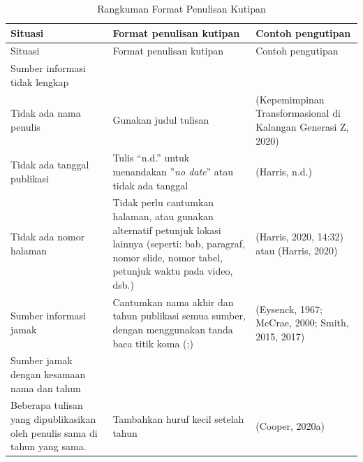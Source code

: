 \documentclass[
  indonesian,
  letterpaper,
]{scrbook}
\begin{document}
\begin{longtable}[]{@{}
  >{\raggedright\arraybackslash}p{}
  >{\raggedright\arraybackslash}p{}
  >{\raggedright\arraybackslash}p{}@{}}
\caption{Rangkuman Format Penulisan
Kutipan}\label{tbl-rangkuman}\tabularnewline
\toprule\noalign{}
\begin{minipage}[b]{\linewidth}\raggedright
Situasi
\end{minipage} & \begin{minipage}[b]{\linewidth}\raggedright
Format penulisan kutipan
\end{minipage} & \begin{minipage}[b]{\linewidth}\raggedright
Contoh pengutipan
\end{minipage} \\
\midrule\noalign{}
\endfirsthead
\toprule\noalign{}
\begin{minipage}[b]{\linewidth}\raggedright
Situasi
\end{minipage} & \begin{minipage}[b]{\linewidth}\raggedright
Format penulisan kutipan
\end{minipage} & \begin{minipage}[b]{\linewidth}\raggedright
Contoh pengutipan
\end{minipage} \\
\midrule\noalign{}
\endhead
\bottomrule\noalign{}
\endlastfoot
Sumber informasi tidak lengkap & & \\
Tidak ada nama penulis & Gunakan judul tulisan & (Kepemimpinan
Transformasional di Kalangan Generasi Z, 2020) \\
Tidak ada tanggal publikasi & Tulis ``n.d.'' untuk menandakan ''\emph{no
date}'' atau tidak ada tanggal & (Harris, n.d.) \\
Tidak ada nomor halaman & Tidak perlu cantumkan halaman, atau gunakan
alternatif petunjuk lokasi lainnya (seperti: bab, paragraf, nomor slide,
nomor tabel, petunjuk waktu pada video, dsb.) & (Harris, 2020, 14:32)
atau (Harris, 2020) \\
Sumber informasi jamak & Cantumkan nama akhir dan tahun publikasi semua
sumber, dengan menggunakan tanda baca titik koma (;) & (Eysenck, 1967;
McCrae, 2000; Smith, 2015, 2017) \\
Sumber jamak dengan kesamaan nama dan tahun & & \\
Beberapa tulisan yang dipublikasikan oleh penulis sama di tahun yang
sama. & Tambahkan huruf kecil setelah tahun & (Cooper, 2020a)


\end{longtable}
\end{document}
